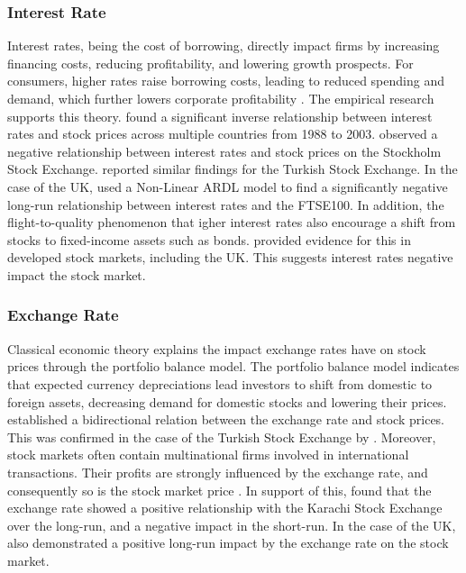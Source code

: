 \documentclass[11pt,a4paper]{article}
\newcommand{\citeboth}[1]{\citeauthor{#1} \citep{#1}}
\begin{document}
\subsubsection{Interest Rate}

Interest rates, being the cost of borrowing, directly impact firms by increasing financing costs, reducing profitability, and lowering growth prospects. For consumers, higher rates raise borrowing costs, leading to reduced spending and demand, which further lowers corporate profitability \citep{boe199section}. 
The empirical research supports this theory. \citeboth{alam2009} found a significant inverse relationship between interest rates and stock prices across multiple countries from 1988 to 2003.
\citeboth{talla2013} observed a negative relationship between interest rates and stock prices on the Stockholm Stock Exchange.
\citeboth{demir2019} reported similar findings for the Turkish Stock Exchange. In the case of the UK, \citeboth{neifar2023} used a Non-Linear ARDL model to find a significantly negative long-run relationship between interest rates and the FTSE100. 
In addition, the flight-to-quality phenomenon that igher interest rates also encourage a shift from stocks to fixed-income 
assets such as bonds. \citeboth{asgharian2016} provided evidence for this in developed stock markets, including the UK. This suggests interest rates 
negative impact the stock market.

\subsubsection{Exchange Rate}

Classical economic theory explains the impact exchange rates have on stock prices through the portfolio balance model. The portfolio balance model indicates that expected currency depreciations lead investors to shift from domestic to foreign assets, decreasing demand for domestic stocks and lowering their prices. 
\citeboth{branson1977} established a bidirectional relation between the exchange rate and stock prices. This was confirmed
in the case of the Turkish Stock Exchange by \citeboth{aydemir2009}. 
Moreover, stock markets often contain multinational firms involved in international transactions. Their profits are strongly influenced by the exchange rate, and consequently so is the stock market price \citep{Wong2018}.
In support of this, \citeboth{khan2018} found that the exchange rate showed a positive relationship with the Karachi Stock Exchange over the long-run, and a negative impact in the short-run. 
In the case of the UK, \citeboth{wong2022} also demonstrated a positive long-run impact by the exchange rate on the stock market.
\end{document}
